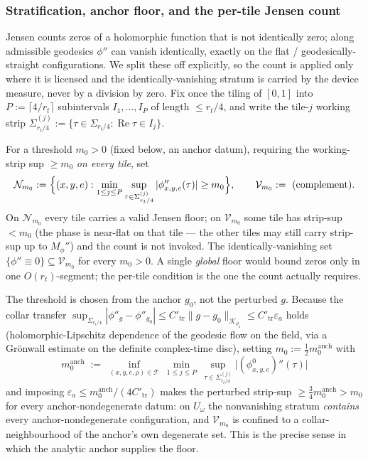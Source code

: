 \subsubsection*{Stratification, anchor floor, and the per-tile Jensen count}

Jensen counts zeros of a holomorphic function that is not identically zero; along
admissible geodesics $\phi''$ can vanish identically, exactly on the flat /
geodesically-straight configurations. We split these off explicitly, so the
count is applied only where it is licensed and the identically-vanishing stratum
is carried by the device measure, never by a division by zero. Fix once the
tiling of $[0,1]$ into $P:=\lceil4/r_t\rceil$ subintervals $I_1,\dots,I_P$ of
length $\le r_t/4$, and write the tile-$j$ working strip
$\Sigma_{r_t/4}^{(j)}:=\{\tau\in\Sigma_{r_t/4}:\operatorname{Re}\tau\in I_j\}$.

\begin{definition}\label{an17:def-strata}
For a threshold $m_0>0$ (fixed below, an anchor datum), requiring the
working-strip sup $\ge m_0$ \emph{on every tile}, set
\begin{equation}\label{an17:eq-strata}
 \mathcal N_{m_0}:=\Bigl\{(x,y,e):\min_{1\le j\le P}\sup_{\tau\in\Sigma_{r_t/4}
 ^{(j)}}|\phi''_{x,y,e}(\tau)|\ge m_0\Bigr\},\qquad\mathcal V_{m_0}:=\text{
 (complement)} .
\end{equation}
On $\mathcal N_{m_0}$ every tile carries a valid Jensen floor; on $\mathcal V_{m_0}$
some tile has strip-sup $<m_0$ (the phase is near-flat on that tile --- the
other tiles may still carry strip-sup up to $M_\phi''$) and the count is not
invoked. The identically-vanishing set $\{\phi''\equiv0\}\subseteq\mathcal V_{m_0}$
for every $m_0>0$. A single \emph{global} floor would bound zeros only in one
$O(r_t)$-segment; the per-tile condition is the one the count actually requires.
\end{definition}

The threshold is chosen from the anchor $g_0$, not the perturbed $g$. Because the
collar transfer $\sup_{\Sigma_{r_t/4}}|\phi''_g-\phi''_{g_0}|\le C'_{\mathrm{tr}}
\|g-g_0\|_{\mathcal K_{\rho_a}}\le C'_{\mathrm{tr}}\varepsilon_a$ holds
(holomorphic-Lipschitz dependence of the geodesic flow on the field, via a
Gr\"onwall estimate on the definite complex-time disc), setting $m_0:=\tfrac12
m_0^{\mathrm{anch}}$ with
\begin{equation}\label{an17:eq-m0}
 m_0^{\mathrm{anch}}\;:=\;\inf_{(x,y,e,\rho)\in\mathcal T}\ \min_{1\le j\le P}\
 \sup_{\tau\in\Sigma_{r_t/4}^{(j)}}\bigl|(\phi^0_{x,y,e})''(\tau)\bigr|
\end{equation}
and imposing $\varepsilon_a\le m_0^{\mathrm{anch}}/(4C'_{\mathrm{tr}})$ makes the
perturbed strip-sup $\ge\tfrac34 m_0^{\mathrm{anch}}>m_0$ for every
anchor-nondegenerate datum: on $U_\omega$ the nonvanishing stratum
\emph{contains} every anchor-nondegenerate configuration, and $\mathcal V_{m_0}$
is confined to a collar-neighbourhood of the anchor's own degenerate set. This is
the precise sense in which the analytic anchor supplies the floor.

